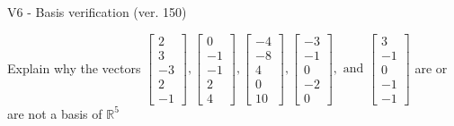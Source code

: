 \begin{exercise}
  \begin{exerciseTitle}V6 - Basis verification (ver. 150)\end{exerciseTitle}
  \begin{exerciseStatement}
    Explain why the vectors \(\left[\begin{array}{r}
2 \\
3 \\
-3 \\
2 \\
-1
\end{array}\right] , \left[\begin{array}{r}
0 \\
-1 \\
-1 \\
2 \\
4
\end{array}\right] , \left[\begin{array}{r}
-4 \\
-8 \\
4 \\
0 \\
10
\end{array}\right] , \left[\begin{array}{r}
-3 \\
-1 \\
0 \\
-2 \\
0
\end{array}\right] , \text{ and } \left[\begin{array}{r}
3 \\
-1 \\
0 \\
-1 \\
-1
\end{array}\right]\) are or are not a basis of \(\mathbb{R}^5\)	



\end{exerciseStatement}
\end{exercise}
